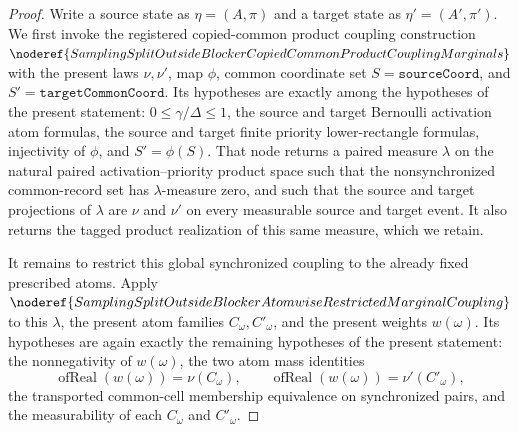 \begin{proof}
Write a source state as \(\eta=(A,\pi)\) and a target state as
\(\eta'=(A',\pi')\).  We first invoke the registered copied-common product
coupling construction
\(\noderef{SamplingSplitOutsideBlockerCopiedCommonProductCouplingMarginals}\)
with the present laws \(\nu,\nu'\), map \(\phi\), common coordinate set
\(S=\texttt{sourceCoord}\), and \(S'=\texttt{targetCommonCoord}\).  Its
hypotheses are exactly among the hypotheses of the present statement:
\(0\le\gamma/\Delta\le1\), the source and target Bernoulli activation atom
formulas, the source and target finite priority lower-rectangle formulas,
injectivity of \(\phi\), and \(S'=\phi(S)\).  That node returns a paired
measure \(\lambda\) on the natural paired activation--priority product space
such that the nonsynchronized common-record set has \(\lambda\)-measure zero,
and such that the source and target projections of \(\lambda\) are \(\nu\)
and \(\nu'\) on every measurable source and target event. It also returns
the tagged product realization of this same measure, which we retain.

It remains to restrict this global synchronized coupling to the already fixed
prescribed atoms.  Apply
\(\noderef{SamplingSplitOutsideBlockerAtomwiseRestrictedMarginalCoupling}\)
to this \(\lambda\), the present atom families \(C_\omega,C'_\omega\), and
the present weights \(w(\omega)\).  Its hypotheses are again exactly the
remaining hypotheses of the present statement: the nonnegativity of
\(w(\omega)\), the two atom mass identities
\[
  \operatorname{ofReal}(w(\omega))=\nu(C_\omega),\qquad
  \operatorname{ofReal}(w(\omega))=\nu'(C'_\omega),
\]
the transported common-cell membership equivalence on synchronized pairs,
and the measurability of each \(C_\omega\) and \(C'_\omega\).


\end{proof}
